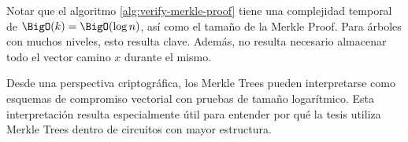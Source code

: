 Notar que el algoritmo \ref{alg:verify-merkle-proof} tiene una complejidad temporal de $\BigO(k) = \BigO(\log n)$, así como el tamaño de la Merkle Proof. Para árboles con muchos niveles, esto resulta clave. Además, no resulta necesario almacenar todo el vector camino $x$ durante el mismo.

Desde una perspectiva criptográfica, los Merkle Trees pueden interpretarse como esquemas de compromiso vectorial \cite{Catalano2013} con pruebas de tamaño logarítmico. Esta interpretación resulta especialmente útil para entender por qué la tesis utiliza Merkle Trees dentro de circuitos con mayor estructura.
